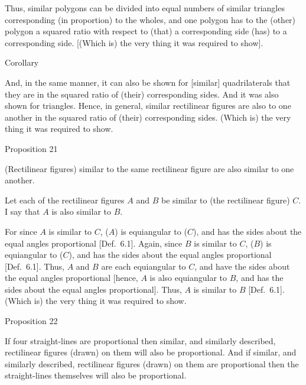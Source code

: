 Thus, similar polygons can be divided into equal
numbers of similar
triangles corresponding (in proportion) to the wholes, and one
polygon has to the (other) polygon a squared ratio with respect to
(that) a corresponding side (has) to a corresponding side. [(Which is) the
very thing it was required to show].\\

\begin{center}
{\large Corollary}
\end{center}\vspace*{-7pt}

And, in the same manner, it can also be shown for [similar] quadrilaterals
that they are in the squared ratio of (their) corresponding sides. And it was also
shown for triangles. Hence, in general, similar rectilinear figures are also to one
another in the squared ratio of (their) corresponding sides. (Which is) the
very thing it was required to show.


\begin{center}
{\large Proposition 21}
\end{center}

(Rectilinear figures) similar to the same rectilinear
figure are also similar to one another.

\epsfysize=2.5in
\centerline{}

Let each of the rectilinear figures $A$ and $B$ be similar to (the rectilinear figure)
$C$.  I say that $A$ is also similar to $B$.

For since $A$ is similar to $C$, ($A$) is equiangular to ($C$), and has the sides about
the equal angles proportional [Def.~6.1].
Again, since $B$ is similar to $C$, ($B$) is equiangular to ($C$), and has the sides about the equal angles proportional [Def.~6.1].
Thus, $A$ and $B$ are each equiangular to $C$, and have the sides about the
equal angles proportional [hence, $A$ is also equiangular to $B$, and has the sides
about the equal angles proportional]. Thus, $A$ is similar to $B$ [Def.~6.1]. (Which is) the very thing it was required
to show.


\begin{center}
{\large Proposition 22}
\end{center}

If four straight-lines are proportional then
similar, and similarly described, rectilinear figures (drawn) on them will also
be proportional. And if similar, and similarly described, rectilinear figures (drawn) on them are proportional then the  straight-lines themselves will also be proportional.

